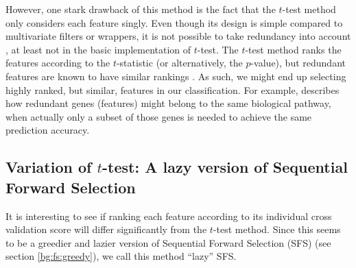 \documentclass[12pt, twoside, a4paper]{report}
\begin{document}
However, one stark drawback of this method is the fact that the $t$-test method only considers each feature singly. Even though its design is simple compared to multivariate filters or wrappers, it is not possible to take redundancy into account \cite{RefWorks:217}, at least not in the basic implementation of $t$-test. The $t$-test method ranks the features according to the $t$-statistic (or alternatively, the $p$-value), but redundant features are known to have similar rankings \cite{RefWorks:163}. As such, we might end up selecting highly ranked, but similar, features in our classification. For example, \cite{RefWorks:220} describes how redundant genes (features) might belong to the same biological pathway, when actually only a subset of those genes is needed to achieve the same prediction accuracy.





\subsection{Variation of $t$-test: A lazy version of Sequential Forward Selection} \label{body:sfs:lazy}

It is interesting to see if ranking each feature according to its individual cross validation score will differ significantly from the $t$-test method. Since this seems to be a greedier and lazier version of Sequential Forward Selection (SFS) (see section \ref{bg:fs:greedy}), we call this method ``lazy'' SFS.
\end{document}
